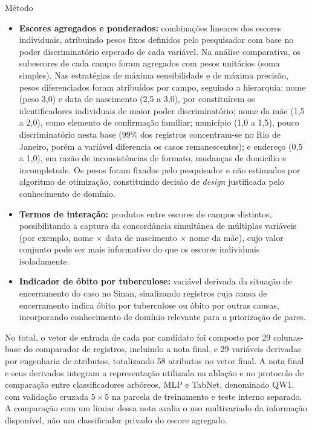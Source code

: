 \begin{chapter}{Método}
\begin{sloppypar}
\begin{itemize}
\item \textbf{Escores agregados e ponderados:} combinações lineares dos escores individuais, atribuindo pesos fixos definidos pelo pesquisador com base no poder discriminatório esperado de cada variável. Na análise comparativa, os subescores de cada campo foram agregados com pesos unitários (soma simples). Nas estratégias de máxima sensibilidade e de máxima precisão, pesos diferenciados foram atribuídos por campo, seguindo a hierarquia: nome (peso 3{,}0) e data de nascimento (2{,}5 a 3{,}0), por constituírem os identificadores individuais de maior poder discriminatório; nome da mãe (1{,}5 a 2{,}0), como elemento de confirmação familiar; município (1{,}0 a 1{,}5), pouco discriminatório nesta base (99\% dos registros concentram-se no Rio de Janeiro, porém a variável diferencia os casos remanescentes); e endereço (0{,}5 a 1{,}0), em razão de inconsistências de formato, mudanças de domicílio e incompletude. Os pesos foram fixados pelo pesquisador e não estimados por algoritmo de otimização, constituindo decisão de \textit{design} justificada pelo conhecimento de domínio.

\item \textbf{Termos de interação:} produtos entre escores de campos distintos, possibilitando a captura da concordância simultânea de múltiplas variáveis (por exemplo, nome $\times$ data de nascimento $\times$ nome da mãe), cujo valor conjunto pode ser mais informativo do que os escores individuais isoladamente.

\item \textbf{Indicador de óbito por tuberculose:} variável derivada da situação de encerramento do caso no Sinan, sinalizando registros cuja causa de encerramento indica óbito por tuberculose ou óbito por outras causas, incorporando conhecimento de domínio relevante para a priorização de pares.
\end{itemize}
\end{sloppypar}

No total, o vetor de entrada de cada par candidato foi composto por 29 colunas-base do comparador de registros, incluindo a nota final, e 29 variáveis derivadas por engenharia de atributos, totalizando 58 atributos no vetor final. A nota final e seus derivados integram a representação utilizada na ablação e no protocolo de comparação entre classificadores arbóreos, MLP e TabNet, denominado QW1, com validação cruzada $5 \times 5$ na parcela de treinamento e teste interno separado. A comparação com um limiar dessa nota avalia o uso multivariado da informação disponível, não um classificador privado do escore agregado.


\end{chapter}
